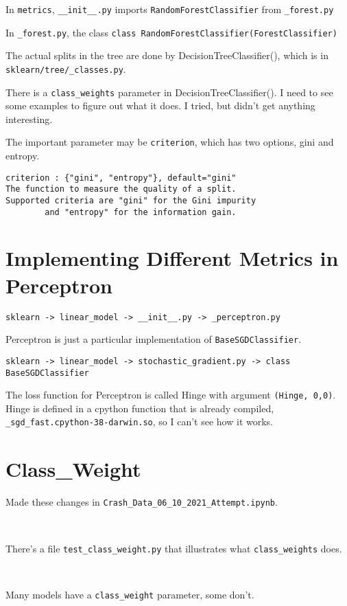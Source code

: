 \documentclass[11pt]{article}
\begin{document}
\begin{spacing}{1.2}
In \verb|metrics|, \verb|__init__.py| imports \verb|RandomForestClassifier| from \verb|_forest.py|

In \verb|_forest.py|, 
the class \verb|class RandomForestClassifier(ForestClassifier)|

The actual splits in the tree are done by DecisionTreeClassifier(), which is in \verb|sklearn/tree/_classes.py|.

There is a \verb|class_weights| parameter in DecisionTreeClassifier().  I need to see some examples to figure out what it does.  I tried, but didn't get anything interesting.  

The important parameter may be \verb|criterion|, which has two options, gini and entropy.  

\begin{verbatim}
criterion : {"gini", "entropy"}, default="gini"
The function to measure the quality of a split. 
Supported criteria are "gini" for the Gini impurity
        and "entropy" for the information gain.
\end{verbatim}

\section{Implementing Different Metrics in Perceptron}

\verb|sklearn -> linear_model -> __init__.py -> _perceptron.py|

Perceptron is just a particular implementation of \verb|BaseSGDClassifier|.

\verb|sklearn -> linear_model -> stochastic_gradient.py -> class BaseSGDClassifier|

The loss function for Perceptron is called Hinge with argument \verb|(Hinge, 0,0)|.  Hinge is defined in a cpython function that is already compiled, \verb|_sgd_fast.cpython-38-darwin.so|, so I can't see how it works.  

\section{Class\_Weight}

Made these changes in \verb|Crash_Data_06_10_2021_Attempt.ipynb|.

\

There's a file \verb|test_class_weight.py| that illustrates what \verb|class_weights| does.  

\

Many models have a \verb|class_weight| parameter, some don't.  


\end{spacing}
\end{document}
